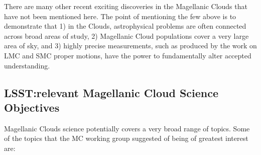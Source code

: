There are many other recent exciting discoveries in the Magellanic Clouds that have  not been mentioned here.  The point of mentioning the few above is to demonstrate  that 1) in the Clouds, astrophysical problems are often connected across broad areas  of study, 2) Magellanic Cloud populations cover a very large area of sky, and 3)  highly precise measurements, such as produced by the work on LMC and SMC  proper motions, have the power to fundamentally alter accepted understanding.  

\subsection{LSST:relevant Magellanic Cloud Science Objectives}
 Magellanic Clouds science potentially covers a very broad range of topics.  Some of  the topics that the MC working group suggested of being of greatest interest are:  
